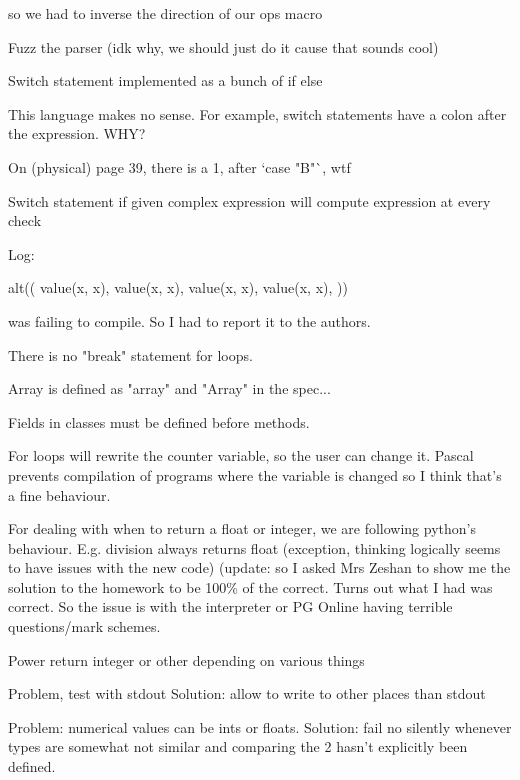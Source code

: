 \documentclass{article}
\begin{document}
so we had to inverse the direction of our ops macro


Fuzz the parser (idk why, we should just do it cause that sounds cool)

Switch statement implemented as a bunch of if else

This language makes no sense. For example, switch statements have a colon after
the expression. WHY?

On (physical) page 39, there is a 1, after `case "B"`, wtf

Switch statement if given complex expression will compute expression at every
check

Log:


alt((
	value(x, x),
	value(x, x),
	value(x, x),
	value(x, x),
))

was failing to compile. So I had to report it to the authors.

There is no "break" statement for loops.

Array is defined as "array" and "Array" in the spec...

Fields in classes must be defined before methods.

For loops will rewrite the counter variable, so the user can change it.
Pascal prevents compilation of programs where the variable is changed so I
think that's a fine behaviour.

For dealing with when to return a float or integer, we are following python's
behaviour. E.g. division always returns float (exception, thinking logically
seems to have issues with the new code) (update: so I asked Mrs Zeshan to show
me the solution to the homework to be 100\% of the correct. Turns out what I
had was correct. So the issue is with the interpreter or PG Online having
terrible questions/mark schemes.

Power return integer or other depending on various things

Problem, test with stdout
Solution: allow to write to other places than stdout

Problem: numerical values can be ints or floats.
Solution: fail no silently whenever types are somewhat not similar and
comparing the 2 hasn't explicitly been defined.
\end{document}
